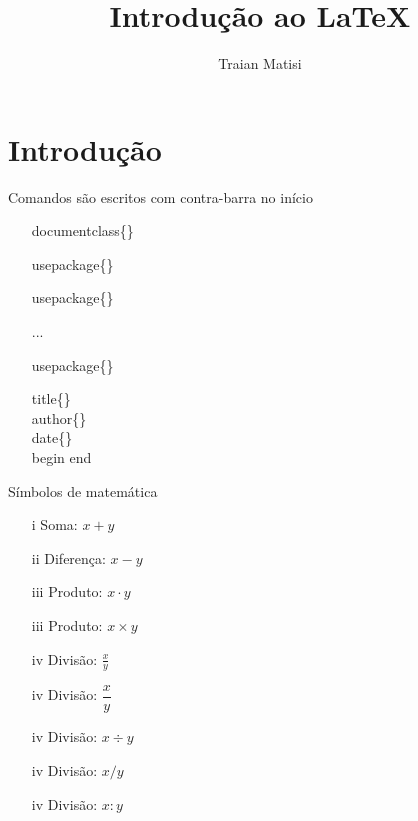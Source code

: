 \documentclass[a4paper, 18pt]{article}
\title{Introdução ao \LaTeX}
\author{Traian Matisi}
\begin{document}
    \maketitle

    \section{Introdução}

    Comandos são escritos com contra-barra no início\\

\begin{itemize}

    \item [] documentclass\{\}
    \item [] usepackage\{\}
    \item [] usepackage\{\}
    \item [] ...
    \item [] usepackage\{\}

    title\{\}\\
    author\{\}\\
    date\{\}\\

    begin{}
    end{}


\end{itemize}
    

    Símbolos de matemática

\begin{itemize} %

    \item [i] Soma: $x+y$
    \item [ii] Diferença: $x-y$
    \item [iii] Produto: $x\cdot y$
    \item [iii] Produto: $x\times y$
    \item [iv] Divisão: $\frac{x}{y}$
    \item [iv] Divisão: $\dfrac{x}{y}$
    \item [iv] Divisão: $x\div y$
    \item [iv] Divisão: $x / y$
    \item [iv] Divisão: $x : y$

\end{itemize}
\end{document}
